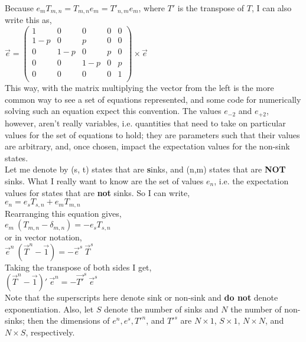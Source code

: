 \documentclass{article}
\begin{document}
Because $e_{m} T_{m,n} = T_{m,n} e_{m} = T'_{n,m} e_{m}$, where $T'$ is the transpose of $T$, I can also write this as, \\

$\vec{e} = 
\left(
\begin{array}{ccccc}
 1 & 0 & 0 & 0 & 0 \\
 1-p & 0 & p & 0 & 0 \\
 0 & 1-p & 0 & p & 0 \\
 0 & 0 & 1-p & 0 & p \\
 0 & 0 & 0 & 0 & 1 \\
\end{array}
\right) \times 
\vec{e}
$ \\


This way, with the matrix multiplying the vector from the left is the more common way to see a set of equations represented, and some code for numerically solving such an equation expect this convention. The values $ e_{-2}$ and $ e_{+2}$, however, aren't really variables, i.e. quantities that need to take on particular values for the set of equations to hold; they are parameters such that their values are arbitrary, and, once chosen, impact the expectation values for the non-sink states. \\

Let me denote by (s, t) states that are {\bf s}inks, and (n,m) states that are {\bf NOT} sinks. What I really want to know are the set of values $ e_{n}$, i.e. the expectation values for states that are {\bf not} sinks. So I can write, \\

$ e_{n} = e_{s} T_{s,n} + e_{m} T_{m,n}$ \\

Rearranging this equation gives, \\

$e_{m} ~(T_{m,n} - \delta_{m,n}) = - e_{s} T_{s,n}$ \\

or in vector notation, \\

$ \vec{e}^{n} ~(\vec{T}^{n} - \vec{1}) = - \vec{e}^{s} ~\vec{T}^{s}$ \\

Taking the transpose of both sides I get, \\

$ (\vec{T}^{n} - \vec{1})' ~\vec{e}^{n}  = - \vec{T'}^{s} ~\vec{e}^{s} $ \\

Note that the superscripts here denote sink or non-sink and {\bf do not} denote exponentiation. Also, let $S$ denote the number of sinks and $N$ the number of non-sinks; then the dimensions of $e^{n}, e^{s}, T'^{n}$, and $T'^{s}$ are 
$N \times 1$, $S \times 1$, $N \times N$, and $N \times S$, respectively. 
\end{document}
